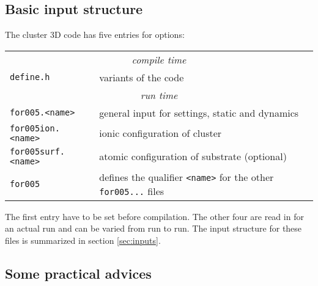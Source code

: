 \documentclass[12pt]{article}
\begin{document}
\subsection{Basic input structure}
The cluster 3D code has five entries for options:
\\[-28pt]
\begin{center}
\begin{tabular}{ll}
\hline
\multicolumn{2}{c}{\it compile time}\\
 {\tt define.h} & variants of the code\\
\hline
\multicolumn{2}{c}{\it run time}\\
 {\tt for005.<name>} & general input for settings, static and
 dynamics\\
 {\tt for005ion.<name>} & ionic configuration of cluster\\
 {\tt for005surf.<name>} & atomic configuration of substrate (optional)\\
 {\tt for005} & defines the qualifier {\tt <name>} for 
                the other {\tt for005...} files\\
\hline
\end{tabular}
\end{center}
The first entry have to be set before compilation. The
other four are read in for an actual run and can be varied from
run to run. The input structure for these files is summarized
in section \ref{sec:inputs}.

\subsection{Some practical advices}
\end{document}
